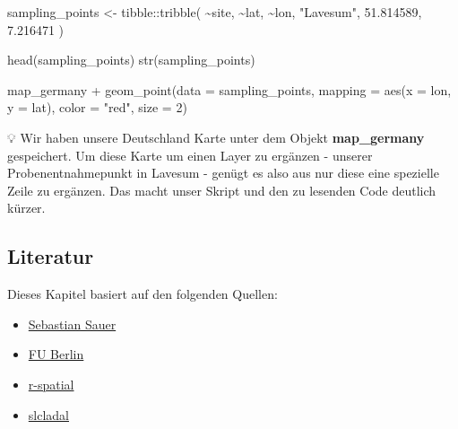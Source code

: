 \documentclass[
]{article}
\newenvironment{Shaded}{\begin{snugshade}}{\end{snugshade}}
\newcommand{\AttributeTok}[1]{\textcolor[rgb]{0.77,0.63,0.00}{#1}}
\newcommand{\DecValTok}[1]{\textcolor[rgb]{0.00,0.00,0.81}{#1}}
\newcommand{\FloatTok}[1]{\textcolor[rgb]{0.00,0.00,0.81}{#1}}
\newcommand{\FunctionTok}[1]{\textcolor[rgb]{0.00,0.00,0.00}{#1}}
\newcommand{\NormalTok}[1]{#1}
\newcommand{\OtherTok}[1]{\textcolor[rgb]{0.56,0.35,0.01}{#1}}
\newcommand{\SpecialCharTok}[1]{\textcolor[rgb]{0.00,0.00,0.00}{#1}}
\newcommand{\StringTok}[1]{\textcolor[rgb]{0.31,0.60,0.02}{#1}}
\providecommand{\tightlist}{%
  \setlength{\itemsep}{0pt}\setlength{\parskip}{0pt}}
\begin{document}
\begin{Shaded}
\begin{Highlighting}[]

\NormalTok{sampling\_points }\OtherTok{\textless{}{-}}\NormalTok{ tibble}\SpecialCharTok{::}\FunctionTok{tribble}\NormalTok{(}
  \SpecialCharTok{\textasciitilde{}}\NormalTok{site, }\SpecialCharTok{\textasciitilde{}}\NormalTok{lat, }\SpecialCharTok{\textasciitilde{}}\NormalTok{lon,}
  \StringTok{"Lavesum"}\NormalTok{, }\FloatTok{51.814589}\NormalTok{, }\FloatTok{7.216471}
\NormalTok{)}

\FunctionTok{head}\NormalTok{(sampling\_points)}
\FunctionTok{str}\NormalTok{(sampling\_points)}

\NormalTok{map\_germany }\SpecialCharTok{+}
  \FunctionTok{geom\_point}\NormalTok{(}\AttributeTok{data =}\NormalTok{ sampling\_points, }\AttributeTok{mapping =} \FunctionTok{aes}\NormalTok{(}\AttributeTok{x =}\NormalTok{ lon, }\AttributeTok{y =}\NormalTok{ lat), }\AttributeTok{color =} \StringTok{"red"}\NormalTok{, }\AttributeTok{size =} \DecValTok{2}\NormalTok{)}
\end{Highlighting}
\end{Shaded}

💡 Wir haben unsere Deutschland Karte unter dem Objekt \textbf{map\_germany} gespeichert. Um diese Karte um einen Layer zu ergänzen - unserer Probenentnahmepunkt in Lavesum - genügt es also aus nur diese eine spezielle Zeile zu ergänzen. Das macht unser Skript und den zu lesenden Code deutlich kürzer.

\hypertarget{literatur-1}{%
\subsection{Literatur}\label{literatur-1}}

Dieses Kapitel basiert auf den folgenden Quellen:

\begin{itemize}
\tightlist
\item
  \href{https://sebastiansauer.github.io/unemp-map/}{Sebastian Sauer}
\item
  \href{https://www.geo.fu-berlin.de/en/v/soga/Introduction-to-R/Spatial-Data/index.html}{FU Berlin}
\item
  \href{https://www.r-spatial.org/r/2018/10/25/ggplot2-sf-2.html}{r-spatial}
\item
  \href{https://slcladal.github.io/maps.html}{slcladal}
\end{itemize}
\end{document}
